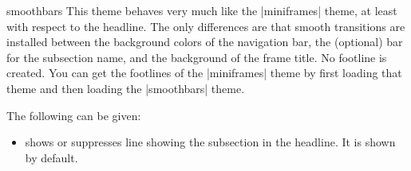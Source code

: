 \begin{outerthemeexample}{smoothbars}
  This theme behaves very much like the |miniframes| theme, at least with respect to the headline. The only differences are that smooth transitions are installed between the background colors of the navigation bar, the (optional) bar for the subsection name, and the background of the frame title. No footline is created. You can get the footlines of the |miniframes| theme by first loading that theme and then loading the |smoothbars| theme.

  The following  can be given:
  \begin{itemize}
  \item {} shows or suppresses line showing the subsection in the headline. It is shown by default.
  \end{itemize}
\end{outerthemeexample}

